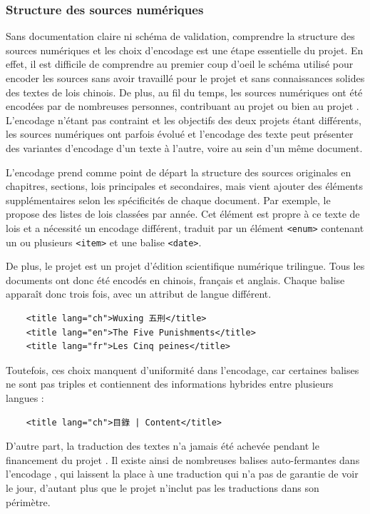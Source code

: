 \subsubsection{Structure des sources numériques}
Sans documentation claire ni schéma de validation, comprendre la structure des sources numériques et les choix d'encodage est une étape essentielle du projet. En effet, il est difficile de comprendre au premier coup d'oeil le schéma utilisé pour encoder les sources sans avoir travaillé pour le projet \LSC et sans connaissances solides des textes de lois chinois. De plus, au fil du temps, les sources numériques ont été encodées par de nombreuses personnes, contribuant au projet \LSC ou bien au projet \COREL. L'encodage n'étant pas contraint et les objectifs des deux projets étant différents, les sources numériques ont parfois évolué et l'encodage des texte peut présenter des variantes d'encodage d'un texte à l'autre, voire au sein d'un même document. 

L'encodage \LSC prend comme point de départ la structure des sources originales en chapitres, sections, lois principales et secondaires, mais vient ajouter des éléments supplémentaires selon les spécificités de chaque document. Par exemple, le \huidian propose des listes de lois classées par année. Cet élément est propre à ce texte de lois et a nécessité un encodage différent, traduit par un élément \texttt{<enum>} contenant un ou plusieurs \texttt{<item>} et une balise \texttt{<date>}.

De plus, le projet \LSC est un projet d'édition scientifique numérique trilingue. Tous les documents ont donc été encodés en chinois, français et anglais. Chaque balise apparaît donc trois fois, avec un attribut de langue différent. 
\begin{verbatim}
    <title lang="ch">Wuxing 五刑</title>
    <title lang="en">The Five Punishments</title>
    <title lang="fr">Les Cinq peines</title>
\end{verbatim}
Toutefois, ces choix manquent d'uniformité dans l'encodage, car certaines balises ne sont pas triples et contiennent des informations hybrides entre plusieurs langues :
\begin{verbatim}
    <title lang="ch">目錄 | Content</title>
\end{verbatim}
D'autre part, la traduction des textes n'a jamais été achevée pendant le financement du projet \LSC. Il existe ainsi de nombreuses balises auto-fermantes dans l'encodage \XML, qui laissent la place à une traduction qui n'a pas de garantie de voir le jour, d'autant plus que le projet \COREL n'inclut pas les traductions dans son périmètre. 

